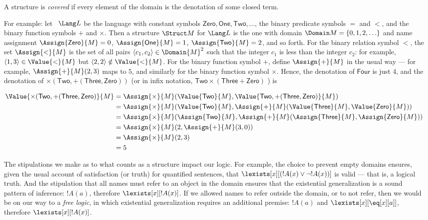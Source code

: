\documentclass[../../include/open-logic-section]{subfiles}
\begin{document}
\begin{defn}
A structure is \emph{covered} if every element of the domain is the
denotation of some closed term.
\end{defn}

For example: let ~$\Lang L$ be the language with constant symbols 
$\mathsf{Zero}, \mathsf{One}, \mathsf{Two}, \ldots$, the binary predicate 
symbols $=$ and $<$, and the binary function symbols $+$ and $\times$. 
Then a structure $\Struct M$ for $\Lang L$ is the one with domain 
$\Domain M = \{0, 1, 2, \ldots \}$ and name assignment $\Assign{\mathsf{Zero}}{M}
= 0$, $\Assign{\mathsf{One}}{M} = 1$, $\Assign{\mathsf{Two}}{M} = 2$, and 
so forth. For the binary relation symbol $<$, the set $\Assign{<}{M}$ is the set of all 
pairs $\langle c_1, c_2 \rangle \in \Domain{M}^2$ such that the integer $c_1$ 
is less than the integer $c_2$: for example, $\langle 1, 3 \rangle \in \Value{<}{M}$ 
but $\langle 2, 2 \rangle \notin \Value{<}{M}$. For the binary function symbol $+$, 
define $\Assign{+}{M}$ in the usual way --- for example, $\Assign{+}{M}(2,3)$ maps 
to $5$, and similarly for the binary function symbol $\times$. Hence, the 
denotation of $\mathsf{Four}$ is just 4, and the denotation of $\times(\mathsf{Two}, 
+(\mathsf{Three},\mathsf{Zero}))$ (or in infix notation, $\mathsf{Two} \times 
(\mathsf{Three} + \mathsf{Zero})$ ) is

\begin{align*} 
\Value{\times(\mathsf{Two}, +(\mathsf{Three},\mathsf{Zero})}{M}&=
\Assign{\times}{M}(\Value{\mathsf{Two}}{M}, \Value{\mathsf{Two}, 
+(\mathsf{Three}, \mathsf{Zero})}{M})\\
&= \Assign{\times}{M}(\Value{\mathsf{Two}}{M}, \Assign{+}{M}(\Value{\mathsf{Three}}{M}, 
\Value{\mathsf{Zero}}{M})) \\
&= \Assign{\times}{M}(\Assign{\mathsf{Two}}{M}, \Assign{+}{M}(\Assign{\mathsf{Three}}{M}, 
\Assign{\mathsf{Zero}}{M})) \\
&= \Assign{\times}{M}(2, \Assign{+}{M}(3, 0)) \\
&= \Assign{\times}{M}(2, 3) \\
&= 5
\end{align*}

The stipulations we make as to what counts as a structure impact our
logic. For example, the choice to prevent empty domains ensures, given
the usual account of satisfaction (or truth) for quantified sentences, that
$\lexists[x][(!A(x) \lor \lnot !A(x))]$ is valid --- that is, a logical truth. And the
stipulation that all names must refer to an object in the domain
ensures that the existential generalization is a sound pattern of
inference: $!A(a)$, therefore $\lexists[x][!A(x)]$. If we allowed names
to refer outside the domain, or to not refer, then we would be on our
way to a \emph{free logic}, in which existential generalization
requires an additional premise: $!A(a)$ and $\lexists[x][\eq[x][a]]$,
therefore $\lexists[x][!A(x)]$.
\end{document}
